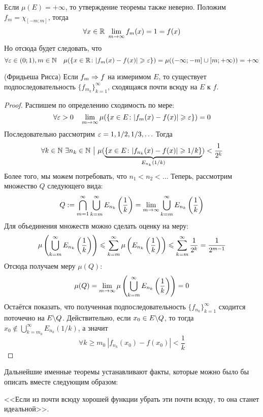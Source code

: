 \begin{note}
	Если $\mu(E) = +\infty$, то утверждение теоремы также неверно. Положим $f_m = \chi_{[-m; m]}$, тогда
	\[
		\forall x \in \mathbb{R}\ \lim_{m \to \infty} f_m(x) = 1 = f(x)
	\]
	Но отсюда будет следовать, что
	\[
		\forall \varepsilon \in (0; 1), m \in \mathbb{N} \quad \mu(\{x \in \mathbb{R} \colon |f_m(x) - f(x)| \geqslant \varepsilon\}) = \mu((-\infty; -m] \cup [m; +\infty)) = +\infty
	\]
\end{note}

\begin{theorem} (Фридьеша Рисса)
	Если $f_m \Rightarrow f$ на измеримом $E$, то существует подпоследовательность $\{f_{m_k}\}_{k = 1}^\infty$, сходящаяся почти всюду на $E$ к $f$.
\end{theorem}

\begin{proof}
	Распишем по определению сходимость по мере:
	\[
		\forall \varepsilon > 0 \quad \lim_{m \to \infty} \mu(\{x \in E \colon |f_m(x) - f(x)| \geqslant \varepsilon\}) = 0
	\]
	Последовательно рассмотрим $\varepsilon = 1, 1/2, 1/3, \ldots$ Тогда
	\[
		\forall k \in \N\ \exists n_k \in \N \such \mu(\underbrace{\{x \in E \colon |f_{n_k}(x) - f(x)| \ge 1/k\}}_{E_{n_k}(1/k)}) < \frac{1}{2^k}
	\]
	Более того, мы можем потребовать, что $n_1 < n_2 < \ldots$ Теперь, рассмотрим множество $Q$ следующего вида:
	\[
		Q := \bigcap_{m = 1}^\infty \bigcup_{k = m}^\infty E_{n_k}\left(\frac{1}{k}\right) = \lim_{m \to \infty} \bigcup_{k = m}^\infty E_{n_k}\left(\frac{1}{k}\right)
	\]
	Для объединения множеств можно сделать оценку на меру:
	\[
		\mu\left(\bigcup_{k = m}^\infty E_{n_k}\left(\frac{1}{k}\right)\right) \leqslant \sum_{k = m}^\infty \mu\left(E_{n_k}\left(\frac{1}{k}\right)\right) \leqslant \sum_{k = m}^\infty \frac{1}{2^k} = \frac{1}{2^{m - 1}}
	\]
	Отсюда получаем меру $\mu(Q)$:
	\[
		\mu(Q) = \lim_{m \to \infty} \mu\left(\bigcup_{k = m}^\infty E_{n_k}\left(\frac{1}{k}\right)\right) = 0
	\]
	Остаётся показать, что полученная подпоследовательность $\{f_{n_k}\}_{k = 1}^\infty$ сходится поточечно на $E \backslash Q$. Действительно, если $x_0 \in E \backslash Q$, то тогда $x_0 \notin \bigcup_{k = m_0}^\infty E_{n_k}(1/k)$, а значит
	\[
		\forall k \ge m_0\ |f_{n_k}(x_0) - f(x_0)| < \frac{1}{k}
	\]
\end{proof}

\begin{note}
	Дальнейшие именные теоремы устанавливают факты, которые можно было бы описать вместе следующим образом:
	
	<<Если из почти всюду хорошей функции убрать эти почти всюду, то она станет идеальной>>.
\end{note}

